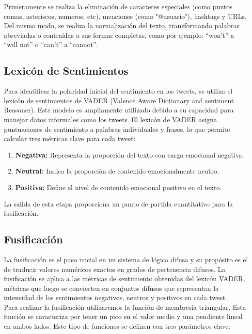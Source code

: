 \documentclass[sigconf, review=false, nonacm]{acmart}
\begin{document}
Primeramente se realiza la eliminación de caracteres especiales (como puntos comas, asteriscos, numeros, etc),
menciones (como "@usuario"), hashtags y URLs. Del mismo modo, se realiza la normalización del texto,
transformando palabras abreviadas o contraídas a sus formas completas, como por ejemplo: ``won't'' a ``will
not'' o ``can't'' a ``cannot''.

\subsection{Lexicón de Sentimientos}
Para identificar la polaridad inicial del sentimiento en los tweets,
se utiliza el lexicón de sentimientos de VADER (Valence Aware Dictionary and sentiment Reasoner).
Este modelo es ampliamente utilizado debido a su capacidad para manejar datos informales como los tweets.
El lexicón de VADER asigna puntuaciones de sentimiento a palabras individuales y frases, lo que permite calcular
tres métricas clave para cada tweet:

\begin{enumerate}
	\item \textbf{Negativa:} Representa la proporción del texto con carga emocional negativa.
	\item \textbf{Neutral:} Indica la proporción de contenido emocionalmente neutro.
	\item \textbf{Positiva:} Define el nivel de contenido emocional positivo en el texto.
\end{enumerate}

La salida de esta etapa proporciona un punto de partida cuantitativo para la fusificación.

\subsection{Fusificación}
La fusificación es el paso inicial en un sistema de lógica difusa y su propósito es el de traducir valores
numéricos exactos en grados de pertenencia difusos. La fusificación se aplica a las métricas de sentimiento
obtenidas del lexicón VADER, métricas que luego se convierten en conjuntos difusos que representan la intensidad
de los sentimientos negativos, neutros y positivos en cada tweet.\\

Para realizar la fusificación utilizaremos la función de membresía triangular. Esta
función se caracteriza por tener un pico en el valor medio y una pendiente lineal en ambos lados. Este tipo de
funciones se definen con tres parámetros clave:
\end{document}
